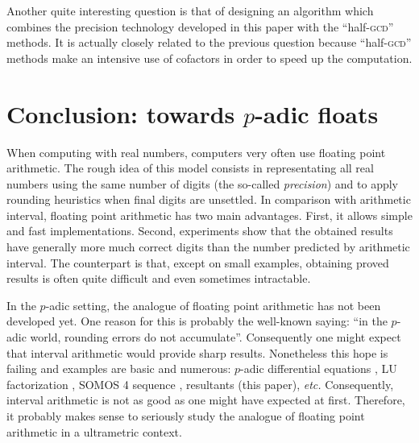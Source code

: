 \documentclass{jT}
\numberwithin{equation}{section}
\theoremstyle{definition}
\begin{document}
Another quite interesting question is that of designing an algorithm 
which combines the precision technology developed in this paper with the 
``half-\textsc{gcd}'' methods. It is actually closely related to the 
previous question because ``half-\textsc{gcd}'' methods make an 
intensive use of cofactors in order to speed up the computation.

\section{Conclusion: towards $p$-adic floats}

When computing with real numbers, computers very often use floating 
point arithmetic. 
The rough idea of this model consists in representating all real numbers 
using the same number of digits (the so-called \emph{precision}) and to
apply rounding heuristics when final digits are unsettled.
In comparison with arithmetic interval, floating point arithmetic has
two main advantages. First, it allows simple and fast implementations.
Second, experiments show that the obtained results have generally
more much correct digits than the number predicted by arithmetic interval.
The counterpart is that, except on small examples, obtaining proved
results is often quite difficult and even sometimes intractable.

In the $p$-adic setting, the analogue of floating point arithmetic has 
not been developed yet. One reason for this is probably the well-known 
saying: ``in the $p$-adic world, rounding errors do not accumulate''. 
Consequently one might expect that interval arithmetic would provide 
sharp results. Nonetheless this hope is failing and examples are basic 
and numerous: $p$-adic differential equations \cite{bostan, padicdiff}, 
LU factorization \cite{LU}, SOMOS 4 sequence \cite{padicprec}, 
resultants (this paper), \emph{etc.} Consequently, interval arithmetic 
is not as good as one might have expected at first. Therefore, it 
probably makes sense to seriously study the analogue of floating point 
arithmetic in a ultrametric context.
\end{document}
